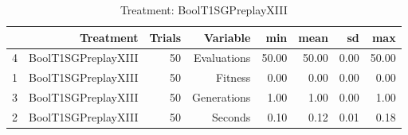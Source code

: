 \begin{table}[ht]
\centering
\begin{tabular}{rrrrrrrr}
  \hline
 & Treatment & Trials & Variable & min & mean & sd & max \\ 
  \hline
4 & BoolT1SGPreplayXIII &  50 & Evaluations & 50.00 & 50.00 & 0.00 & 50.00 \\ 
  1 & BoolT1SGPreplayXIII &  50 & Fitness & 0.00 & 0.00 & 0.00 & 0.00 \\ 
  3 & BoolT1SGPreplayXIII &  50 & Generations & 1.00 & 1.00 & 0.00 & 1.00 \\ 
  2 & BoolT1SGPreplayXIII &  50 & Seconds & 0.10 & 0.12 & 0.01 & 0.18 \\ 
   \hline
\end{tabular}
\caption{Treatment: BoolT1SGPreplayXIII} 
\end{table}
